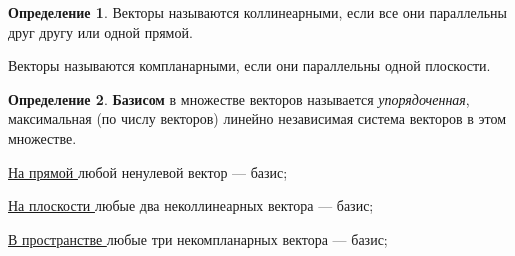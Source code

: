 \documentclass{article}
\theoremstyle{definition}
\newtheorem{definition}{Определение}
\begin{document}
\begin{definition}
Векторы называются коллинеарными, если все они параллельны друг другу или одной прямой.

Векторы называются компланарными, если они параллельны одной плоскости.
\end{definition}

\begin{definition}
\textbf{Базисом} в множестве векторов называется \textit{упорядоченная}, максимальная (по числу векторов) линейно независимая система векторов в этом множестве.

\underline{На прямой } любой ненулевой вектор --- базис;

\underline{На плоскости } любые два неколлинеарных вектора --- базис;

\underline{В пространстве } любые три некомпланарных вектора --- базис;
\end{definition}
\end{document}
